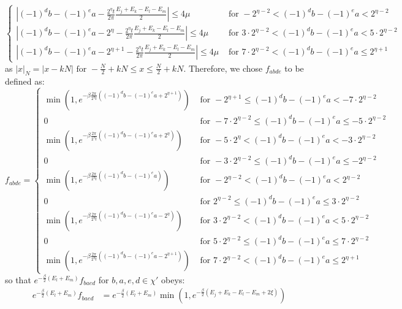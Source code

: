 \documentclass[aps,floatfix,10pt,amssymb,amsfont,amsmath,superscriptaddress,float,nofootinbib,longbibliography,nobalancelastpage,twocolumn]{revtex4-2}
\begin{document}
\begin{widetext}
\begin{equation}
\begin{cases}
     |(-1)^db-(-1)^ea-\frac{2^{\eta}t}{2\pi}\frac{E_j+E_k-E_l-E_m}{2}|\leq 4\mu&\text{ for }-2^{\eta-2}< (-1)^db-(-1)^ea < 2^{\eta-2}\\
     |(-1)^db-(-1)^ea-2^{\eta}-\frac{2^{\eta}t}{2\pi}\frac{E_j+E_k-E_l-E_m}{2}|\leq 4\mu&\text{ for }3\cdot 2^{\eta-2}< (-1)^db-(-1)^ea < 5\cdot 2^{\eta-2}\\
     |(-1)^db-(-1)^ea-2^{\eta+1}-\frac{2^{\eta}t}{2\pi}\frac{E_j+E_k-E_l-E_m}{2}|\leq 4\mu&\text{ for }7\cdot2^{\eta-2}< (-1)^db-(-1)^ea \leq 2^{\eta+1}
    \end{cases}
    \label{eq:conditions}
\end{equation}
as $|x|_N = |x - kN| \text{ for } -\frac{N}{2} + kN \leq x \leq \frac{N}{2} + kN$.
Therefore, we chose $f_{abde}$ to be defined as:
\begin{equation}
    f_{abde} = \begin{cases}
    \min(1,e^{-\beta\frac{2\pi}{2^{\eta}t}((-1)^db-(-1)^ea+2^{\eta+1})})&\text{ for }-2^{\eta+1}\leq (-1)^db-(-1)^ea < -7\cdot2^{\eta-2}\\
    0&\text{ for }-7\cdot2^{\eta-2}\leq (-1)^db-(-1)^ea \leq -5\cdot2^{\eta-2}\\
    \min(1,e^{-\beta\frac{2\pi}{2^{\eta}t}((-1)^db-(-1)^ea+2^{\eta})})&\text{ for }-5\cdot 2^{\eta}< (-1)^db-(-1)^ea < -3\cdot2^{\eta-2}\\
    0&\text{ for }-3\cdot2^{\eta-2}\leq (-1)^db-(-1)^ea \leq -2^{\eta-2}\\
     \min(1,e^{-\beta\frac{2\pi}{2^{\eta}t}((-1)^db-(-1)^ea)})&\text{ for }-2^{\eta-2}<(-1)^db-(-1)^ea < 2^{\eta-2}\\
    0&\text{ for }2^{\eta-2}\leq (-1)^db-(-1)^ea \leq 3\cdot2^{\eta-2}\\
     \min(1,e^{-\beta\frac{2\pi}{2^{\eta}t}((-1)^db-(-1)^ea-2^{\eta})})&\text{ for }3\cdot 2^{\eta-2}< (-1)^db-(-1)^ea < 5\cdot2^{\eta-2}\\
     0&\text{ for }5\cdot2^{\eta-2}\leq (-1)^db-(-1)^ea \leq 7\cdot2^{\eta-2}\\
     \min(1,e^{-\beta\frac{2\pi}{2^{\eta}t}((-1)^db-(-1)^ea-2^{\eta+1})})&\text{ for }7\cdot 2^{\eta-2}< (-1)^db-(-1)^ea \leq 2^{\eta+1}
    \end{cases}
\end{equation}
so that $e^{-\frac{\beta}{2}(E_l+E_m)}f_{baed}$ for $b, a, e, d \in \chi'$ obeys:
\begin{equation}
    \begin{aligned}
    e^{-\frac{\beta}{2}(E_l+E_m)}f_{baed} &= e^{-\frac{\beta}{2}(E_l+E_m)}\min(1,e^{-\frac{\beta}{2}(E_j+E_k-E_l-E_m + 2\xi)})\\

\end{aligned}
\end{equation}
\end{widetext}
\end{document}

